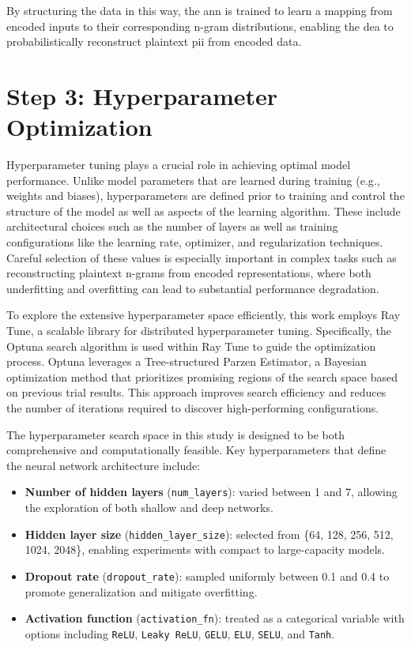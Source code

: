 By structuring the data in this way, the \ac{ann} is trained to learn a mapping from encoded inputs to their corresponding n-gram distributions, enabling the \ac{dea} to probabilistically reconstruct plaintext \ac{pii} from encoded data.

\section{Step 3: Hyperparameter Optimization}

Hyperparameter tuning plays a crucial role in achieving optimal model performance.
Unlike model parameters that are learned during training (e.g., weights and biases), hyperparameters are defined prior to training and control the structure of the model as well as aspects of the learning algorithm.
These include architectural choices such as the number of layers as well as training configurations like the learning rate, optimizer, and regularization techniques.
Careful selection of these values is especially important in complex tasks such as reconstructing plaintext n-grams from encoded representations, where both underfitting and overfitting can lead to substantial performance degradation.

To explore the extensive hyperparameter space efficiently, this work employs Ray Tune, a scalable library for distributed hyperparameter tuning.
Specifically, the Optuna search algorithm is used within Ray Tune to guide the optimization process.
Optuna leverages a Tree-structured Parzen Estimator, a Bayesian optimization method that prioritizes promising regions of the search space based on previous trial results.
This approach improves search efficiency and reduces the number of iterations required to discover high-performing configurations.

The hyperparameter search space in this study is designed to be both comprehensive and computationally feasible.
Key hyperparameters that define the neural network architecture include:

\begin{itemize}
    \item \textbf{Number of hidden layers} (\texttt{num\_layers}): varied between 1 and 7, allowing the exploration of both shallow and deep networks.
    \item \textbf{Hidden layer size} (\texttt{hidden\_layer\_size}): selected from \{64, 128, 256, 512, 1024, 2048\}, enabling experiments with compact to large-capacity models.
    \item \textbf{Dropout rate} (\texttt{dropout\_rate}): sampled uniformly between 0.1 and 0.4 to promote generalization and mitigate overfitting.
    \item \textbf{Activation function} (\texttt{activation\_fn}): treated as a categorical variable with options including \texttt{ReLU}, \texttt{Leaky ReLU}, \texttt{GELU}, \texttt{ELU}, \texttt{SELU}, and \texttt{Tanh}.
\end{itemize}


